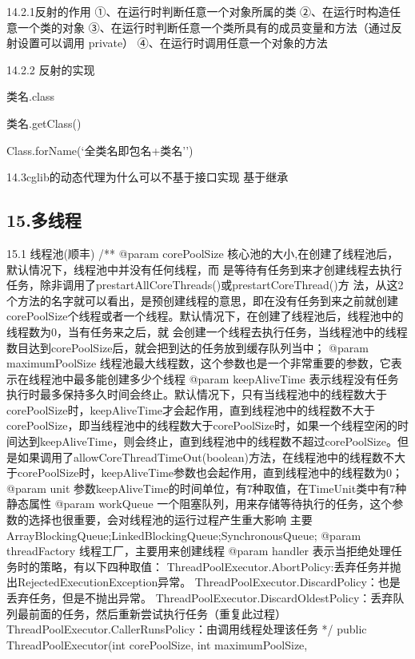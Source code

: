 \documentclass[UTF8]{ctexart}
\begin{document}
14.2.1反射的作用
①、在运行时判断任意一个对象所属的类
②、在运行时构造任意一个类的对象
③、在运行时判断任意一个类所具有的成员变量和方法（通过反射设置可以调用 private）
④、在运行时调用任意一个对象的方法

14.2.2 反射的实现

类名.class

类名.getClass()

Class.forName(‘全类名即包名+类名'’)

14.3cglib的动态代理为什么可以不基于接口实现
基于继承

\subsection{15.多线程}

15.1 线程池(顺丰)
/**
@param corePoolSize 核心池的大小,在创建了线程池后，默认情况下，线程池中并没有任何线程，而  是等待有任务到来才创建线程去执行任务，除非调用了prestartAllCoreThreads()或prestartCoreThread()方    法，从这2个方法的名字就可以看出，是预创建线程的意思，即在没有任务到来之前就创建corePoolSize个线程或者一个线程。默认情况下，在创建了线程池后，线程池中的线程数为0，当有任务来之后，就    会创建一个线程去执行任务，当线程池中的线程数目达到corePoolSize后，就会把到达的任务放到缓存队列当中；
@param maximumPoolSize  线程池最大线程数，这个参数也是一个非常重要的参数，它表示在线程池中最多能创建多少个线程
@param keepAliveTime 表示线程没有任务执行时最多保持多久时间会终止。默认情况下，只有当线程池中的线程数大于corePoolSize时，keepAliveTime才会起作用，直到线程池中的线程数不大于corePoolSize，即当线程池中的线程数大于corePoolSize时，如果一个线程空闲的时间达到keepAliveTime，则会终止，直到线程池中的线程数不超过corePoolSize。但是如果调用了allowCoreThreadTimeOut(boolean)方法，在线程池中的线程数不大于corePoolSize时，keepAliveTime参数也会起作用，直到线程池中的线程数为0；
@param unit 参数keepAliveTime的时间单位，有7种取值，在TimeUnit类中有7种静态属性
@param workQueue 一个阻塞队列，用来存储等待执行的任务，这个参数的选择也很重要，会对线程池的运行过程产生重大影响 主要ArrayBlockingQueue;LinkedBlockingQueue;SynchronousQueue;
@param threadFactory 线程工厂，主要用来创建线程
@param handler 表示当拒绝处理任务时的策略，有以下四种取值：
ThreadPoolExecutor.AbortPolicy:丢弃任务并抛出RejectedExecutionException异常。
ThreadPoolExecutor.DiscardPolicy：也是丢弃任务，但是不抛出异常。
ThreadPoolExecutor.DiscardOldestPolicy：丢弃队列最前面的任务，然后重新尝试执行任务（重复此过程）
ThreadPoolExecutor.CallerRunsPolicy：由调用线程处理该任务
  */
public ThreadPoolExecutor(int corePoolSize,
                       int maximumPoolSize,
\end{document}
